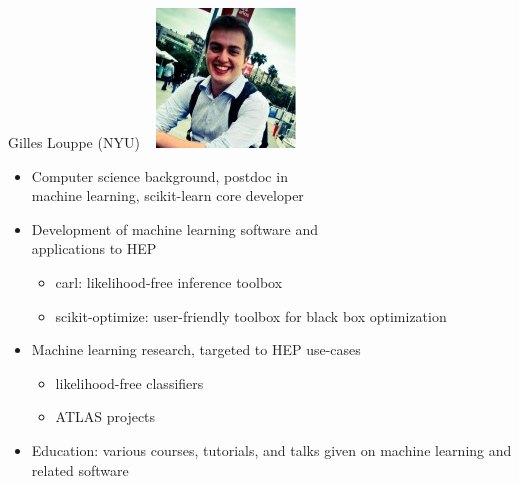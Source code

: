 \documentclass{beamer}
\begin{document}
\begin{frame}{Gilles Louppe (NYU)}
\mbox{ } \hfill \includegraphics[height=2 cm]{gilles_louppe.png}

\vspace{-2 cm}
\begin{itemize}
\item Computer science background, postdoc in \\ machine learning, scikit-learn core developer
\item Development of machine learning software and \\ applications to HEP
\begin{itemize}
\item carl: likelihood-free inference toolbox
\item scikit-optimize: user-friendly toolbox for black box optimization
\end{itemize}

\item Machine learning research, targeted to HEP use-cases
\begin{itemize}
\item likelihood-free classifiers
\item ATLAS projects
\end{itemize}

\item Education: various courses, tutorials, and talks given on machine learning and related software
\end{itemize}
\end{frame}
\end{document}
